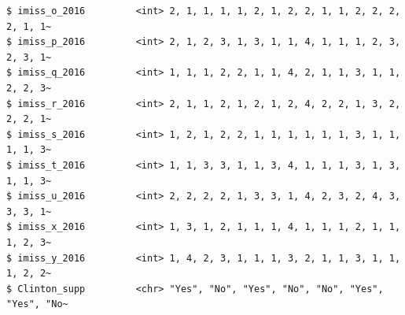 \documentclass[
  letterpaper,
  DIV=11,
  numbers=noendperiod]{scrreprt}
\theoremstyle{definition}
\theoremstyle{remark}
\begin{document}
\begin{verbatim}
$ imiss_o_2016         <int> 2, 1, 1, 1, 1, 2, 1, 2, 2, 1, 1, 2, 2, 2, 2, 1, 1~
$ imiss_p_2016         <int> 2, 1, 2, 3, 1, 3, 1, 1, 4, 1, 1, 1, 2, 3, 2, 3, 1~
$ imiss_q_2016         <int> 1, 1, 1, 2, 2, 1, 1, 4, 2, 1, 1, 3, 1, 1, 2, 2, 3~
$ imiss_r_2016         <int> 2, 1, 1, 2, 1, 2, 1, 2, 4, 2, 2, 1, 3, 2, 2, 2, 1~
$ imiss_s_2016         <int> 1, 2, 1, 2, 2, 1, 1, 1, 1, 1, 1, 3, 1, 1, 1, 1, 3~
$ imiss_t_2016         <int> 1, 1, 3, 3, 1, 1, 3, 4, 1, 1, 1, 3, 1, 3, 1, 1, 3~
$ imiss_u_2016         <int> 2, 2, 2, 2, 1, 3, 3, 1, 4, 2, 3, 2, 4, 3, 3, 3, 1~
$ imiss_x_2016         <int> 1, 3, 1, 2, 1, 1, 1, 4, 1, 1, 1, 2, 1, 1, 1, 2, 3~
$ imiss_y_2016         <int> 1, 4, 2, 3, 1, 1, 1, 3, 2, 1, 1, 3, 1, 1, 1, 2, 2~
$ Clinton_supp         <chr> "Yes", "No", "Yes", "No", "No", "Yes", "Yes", "No~
\end{verbatim}
\end{document}
